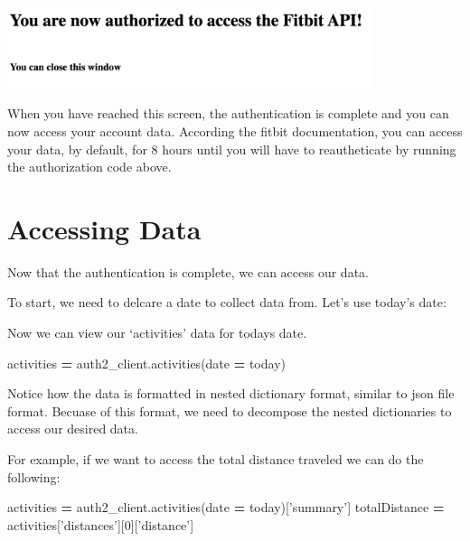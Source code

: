 \documentclass[]{book}
\newenvironment{Shaded}{\begin{snugshade}}{\end{snugshade}}
\newcommand{\DecValTok}[1]{\textcolor[rgb]{0.00,0.00,0.81}{#1}}
\newcommand{\SpecialCharTok}[1]{\textcolor[rgb]{0.00,0.00,0.00}{#1}}
\newcommand{\StringTok}[1]{\textcolor[rgb]{0.31,0.60,0.02}{#1}}
\newcommand{\CommentTok}[1]{\textcolor[rgb]{0.56,0.35,0.01}{\textit{#1}}}
\newcommand{\OperatorTok}[1]{\textcolor[rgb]{0.81,0.36,0.00}{\textbf{#1}}}
\newcommand{\BuiltInTok}[1]{#1}
\newcommand{\NormalTok}[1]{#1}
\begin{document}
\includegraphics[width=0.80000\textwidth]{images/done.png}

When you have reached this screen, the authentication is complete and
you can now access your account data. According the fitbit
documentation, you can access your data, by default, for 8 hours until
you will have to reautheticate by running the authorization code above.

\section{Accessing Data}\label{accessing-data}

Now that the authentication is complete, we can access our data.

To start, we need to delcare a date to collect data from. Let's use
today's date:

\begin{Shaded}
\end{Shaded}

Now we can view our `activities' data for todays date.

\begin{Shaded}
\begin{Highlighting}[]
\NormalTok{activities }\OperatorTok{=}\NormalTok{ auth2_client.activities(date }\OperatorTok{=}\NormalTok{ today)}
\end{Highlighting}
\end{Shaded}

Notice how the data is formatted in nested dictionary format, similar to
json file format. Becuase of this format, we need to decompose the
nested dictionaries to access our desired data.

For example, if we want to access the total distance traveled we can do
the following:

\begin{Shaded}
\begin{Highlighting}[]
\NormalTok{activities }\OperatorTok{=}\NormalTok{ auth2_client.activities(date }\OperatorTok{=}\NormalTok{ today)[}\StringTok{'summary'}\NormalTok{]}
\NormalTok{totalDistance }\OperatorTok{=}\NormalTok{ activities[}\StringTok{'distances'}\NormalTok{][}\DecValTok{0}\NormalTok{][}\StringTok{'distance'}\NormalTok{]}
\end{Highlighting}
\end{Shaded}
\end{document}
